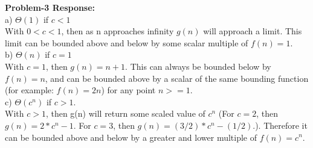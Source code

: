 \documentclass[11pt]{article}
\begin{document}
\noindent
\smallskip
{\bf Problem-3 Response:}\\
\noindent
a) $\Theta(1)$ if $c<1$\\
\indent With $0 < c < 1$, then as n approaches infinity $g(n)$ will approach a limit. This limit can be bounded above and below by some scalar multiple of $f(n)=1$.\\

\noindent
b) $\Theta(n)$ if $c=1$\\
\indent With $c=1$, then $g(n) = n + 1$. This can always be bounded below by $f(n)=n$, and can be bounded above by a scalar of the same bounding function (for example: $f(n)=2n$) for any point $n>=1$.\\

\noindent
c) $\Theta(c^n)$ if $c>1$.\\
\indent With $c > 1$, then g(n) will return some scaled value of $c^n$ (For $c=2$, then $g(n)=2 * c^n - 1$. For $c=3$, then $g(n)=(3/2) * c^n - (1/2)$.).
\newline
\indent Therefore it can be bounded above and below by a greater and lower multiple of $f(n)=c^n$.
\end{document}
